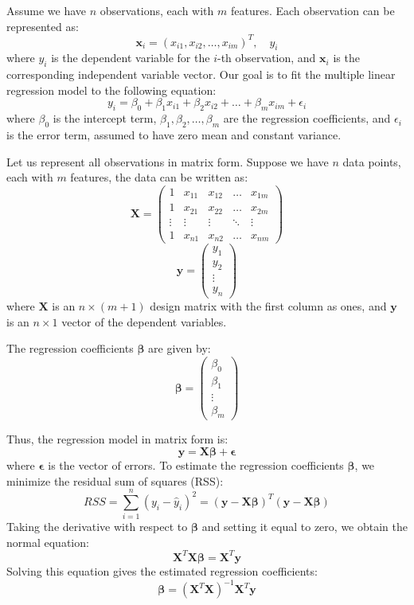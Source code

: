 \documentclass[withoutpreface,bwprint]{cumcmthesis} %
\begin{document}
\begin{solution}
Assume we have $n$ observations, each with $m$ features. Each observation can be represented as:
\[
\mathbf{x}_i = (x_{i1}, x_{i2}, \dots, x_{im})^T, \quad y_i
\]
where $y_i$ is the dependent variable for the $i$-th observation, and $\mathbf{x}_i$ is the corresponding independent variable vector. Our goal is to fit the multiple linear regression model to the following equation:
\[
y_i = \beta_0 + \beta_1 x_{i1} + \beta_2 x_{i2} + \dots + \beta_m x_{im} + \epsilon_i
\]
where $\beta_0$ is the intercept term, $\beta_1, \beta_2, \dots, \beta_m$ are the regression coefficients, and $\epsilon_i$ is the error term, assumed to have zero mean and constant variance.


Let us represent all observations in matrix form. Suppose we have $n$ data points, each with $m$ features, the data can be written as:
\[
\mathbf{X} = \begin{pmatrix}
1 & x_{11} & x_{12} & \dots & x_{1m} \\
1 & x_{21} & x_{22} & \dots & x_{2m} \\
\vdots & \vdots & \vdots & \ddots & \vdots \\
1 & x_{n1} & x_{n2} & \dots & x_{nm}
\end{pmatrix}
\]
\[
\mathbf{y} = \begin{pmatrix}
y_1 \\
y_2 \\
\vdots \\
y_n
\end{pmatrix}
\]
where $\mathbf{X}$ is an $n \times (m+1)$ design matrix with the first column as ones, and $\mathbf{y}$ is an $n \times 1$ vector of the dependent variables.

The regression coefficients $\boldsymbol{\beta}$ are given by:
\[
\boldsymbol{\beta} = \begin{pmatrix}
\beta_0 \\
\beta_1 \\
\vdots \\
\beta_m
\end{pmatrix}
\]

Thus, the regression model in matrix form is:
\[
\mathbf{y} = \mathbf{X} \boldsymbol{\beta} + \boldsymbol{\epsilon}
\]
where $\boldsymbol{\epsilon}$ is the vector of errors.
To estimate the regression coefficients $\boldsymbol{\beta}$, we minimize the residual sum of squares (RSS):
\[
RSS = \sum_{i=1}^{n} (y_i - \hat{y}_i)^2 = (\mathbf{y} - \mathbf{X} \boldsymbol{\beta})^T (\mathbf{y} - \mathbf{X} \boldsymbol{\beta})
\]
Taking the derivative with respect to $\boldsymbol{\beta}$ and setting it equal to zero, we obtain the normal equation:
\[
\mathbf{X}^T \mathbf{X} \boldsymbol{\beta} = \mathbf{X}^T \mathbf{y}
\]
Solving this equation gives the estimated regression coefficients:
\[
\boldsymbol{\beta} = (\mathbf{X}^T \mathbf{X})^{-1} \mathbf{X}^T \mathbf{y}
\]
\end{solution}
\end{document}
